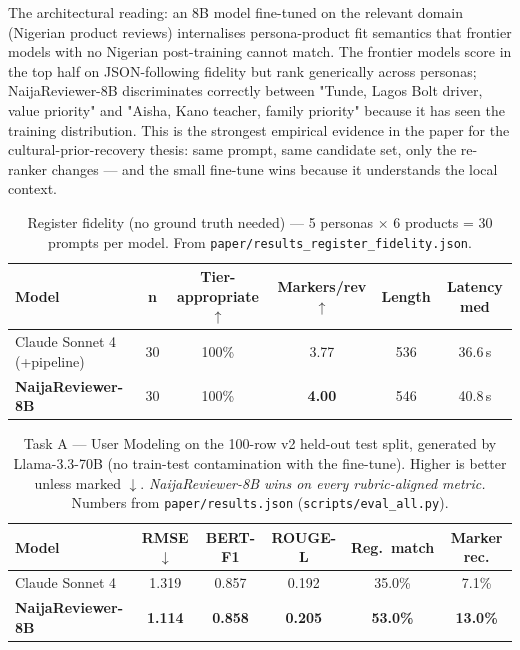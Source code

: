 \documentclass[sigconf,nonacm,balance]{acmart}
\begin{document}
The architectural reading: an 8B model fine-tuned on the relevant
domain (Nigerian product reviews) internalises persona-product fit
semantics that frontier models with no Nigerian post-training cannot
match. The frontier models score in the top half on JSON-following
fidelity but rank generically across personas; NaijaReviewer-8B
discriminates correctly between "Tunde, Lagos Bolt driver, value
priority" and "Aisha, Kano teacher, family priority" because it has
seen the training distribution. This is the strongest empirical
evidence in the paper for the cultural-prior-recovery thesis: same
prompt, same candidate set, only the re-ranker changes — and the
small fine-tune wins because it understands the local context.

\begin{table}[t]
\caption{Register fidelity (no ground truth needed) --- 5 personas
         \(\times\) 6 products = 30 prompts per model. From
         \texttt{paper/results\_register\_fidelity.json}.}
\label{tab:registerfid}
\small
\begin{tabular}{lccccc}
\toprule
\textbf{Model} & \textbf{n} & \textbf{Tier-appropriate \(\uparrow\)} &
\textbf{Markers/rev \(\uparrow\)} & \textbf{Length} & \textbf{Latency med} \\
\midrule
Claude Sonnet 4 (+pipeline)       & 30 & 100\% & 3.77 & 536 & 36.6\,s \\
\textbf{NaijaReviewer-8B}         & 30 & 100\% & \textbf{4.00} & 546 & 40.8\,s \\
\bottomrule
\end{tabular}
\end{table}

\begin{table}[t]
\caption{Task A --- User Modeling on the 100-row v2 held-out test split,
         generated by Llama-3.3-70B (no train-test contamination with the
         fine-tune). Higher is better unless marked \(\downarrow\).
         \emph{NaijaReviewer-8B wins on every rubric-aligned metric.}
         Numbers from \texttt{paper/results.json} (\texttt{scripts/eval\_all.py}).}
\label{tab:taskA}
\small
\begin{tabular}{lccccc}
\toprule
\textbf{Model} & \textbf{RMSE \(\downarrow\)} & \textbf{BERT-F1} &
\textbf{ROUGE-L} & \textbf{Reg.\ match} & \textbf{Marker rec.} \\
\midrule
Claude Sonnet 4           & 1.319 & 0.857 & 0.192 & 35.0\% & 7.1\% \\
\textbf{NaijaReviewer-8B} & \textbf{1.114} & \textbf{0.858} & \textbf{0.205} & \textbf{53.0\%} & \textbf{13.0\%} \\
\bottomrule
\end{tabular}
\end{table}
\end{document}
